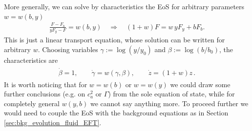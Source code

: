 More generally, we can solve by characteristics the EoS for arbitrary parameters $w=w(b,y)$
\begin{align}\label{eq:eos_general_case}
    \frac{F-F_b}{yF_y-F}=w(b,y)\quad\Rightarrow\quad (1+w)F=w\, yF_y+bF_b.
\end{align}
This is just a linear transport equation, whose solution can be written for arbitrary $w$.
Choosing variables $\gamma:=\log (y/y_0)$ and $\beta:=\log (b/b_0)$, the characteristics are
{\small
\begin{align}\begin{aligned}
    \dot{\beta}=1,\qquad
    \dot{\gamma}=w(\gamma,\beta),\qquad
    \dot{z}=(1+w)z\,.
\end{aligned}\end{align}}
It is worth noticing that for $w=w(b)$ or $w=w(y)$ we could draw some further conclusions (e.g. on $c_a^2$ or $\Gamma$) from the sole equation of state, while for completely general $w(y,b)$ we cannot say anything more.
To proceed further we would need to couple the EoS with the background equations as in Section \ref{sec:bkg_evolution_fluid_EFT}.

